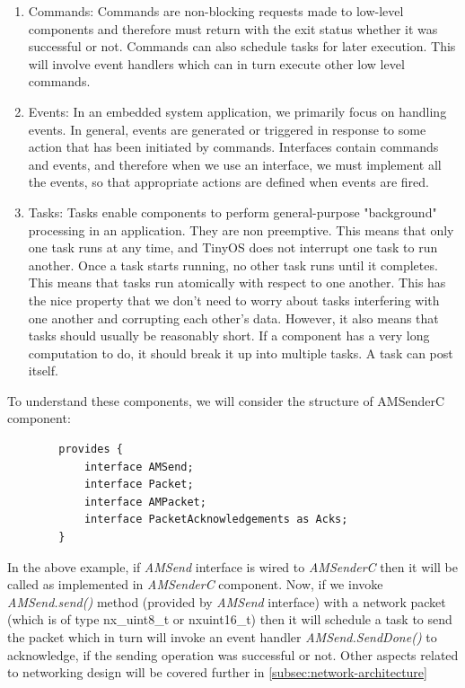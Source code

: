     \begin{enumerate}
        \item Commands: Commands are non-blocking requests made to low-level components and therefore must return with the exit status whether it was successful or not. Commands can also schedule tasks for later execution. This will involve event handlers which can in turn execute other low level commands.
        
        \item Events:  In an embedded system application, we primarily focus on  handling events. In general, events are generated or triggered in response to some action that has been initiated by commands. Interfaces contain commands and events, and therefore when we use an interface, we must implement all the events, so that appropriate actions are defined when events are fired.
        
        \item Tasks: Tasks enable components to perform general-purpose "background" processing in an application. They are  non preemptive. This  means  that  only  one  task  runs  at any time, and TinyOS does not interrupt one task to run another. Once a task starts running, no other task runs until it completes. This means that  tasks  run  atomically  with  respect  to  one  another. This  has  the nice  property  that we  don’t  need  to  worry  about  tasks  interfering with one another and corrupting each other’s data. However, it also means that tasks should usually be reasonably short. If a component has a very long computation to do, it should break it up into multiple tasks. A task can post itself.
    \end{enumerate}
    
    \par
    To understand these components, we will consider the structure of AMSenderC component:
    
    \begin{verbatim}
        provides {
            interface AMSend;
            interface Packet;
            interface AMPacket;
            interface PacketAcknowledgements as Acks;
        }
    \end{verbatim}
    
    In the above example, if \textit{AMSend} interface is wired to \textit{AMSenderC} then it will be called as implemented in \textit{AMSenderC} component. Now, if we invoke \textit{AMSend.send()} method (provided by \textit{AMSend} interface) with a network packet (which is of type nx\_uint8\_t or nx\-uint16\_t) then it will schedule a task to send the packet which in turn will invoke an event handler \textit{AMSend.SendDone()} to acknowledge, if the sending operation was successful or not. Other aspects related to networking design will be covered further in \ref{subsec:network-architecture}
    
